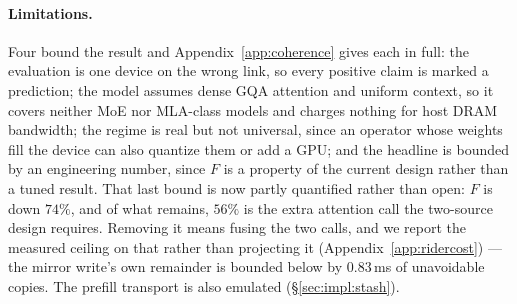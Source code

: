 \paragraph{Limitations.} Four bound the result and
Appendix~\ref{app:coherence} gives each in full: the evaluation is one device on the
wrong link, so every positive claim is marked a prediction; the model assumes dense
GQA attention and uniform context, so it covers neither MoE nor MLA-class models and
charges nothing for host DRAM bandwidth; the regime is real but not universal, since
an operator whose weights fill the device can also quantize them or add a GPU; and
the headline is bounded by an engineering number, since $F$ is a property of the
current design rather than a tuned result. That last bound is now partly quantified
rather than open: $F$ is down $74\%$, and of what remains, $56\%$ is the extra
attention call the two-source design requires. Removing it means fusing the two
calls, and we report the measured ceiling on that rather than projecting it
(Appendix~\ref{app:ridercost}) --- the mirror write's own remainder is bounded below
by $0.83$\,ms of unavoidable copies. The prefill transport is also emulated
(\S\ref{sec:impl:stash}).
